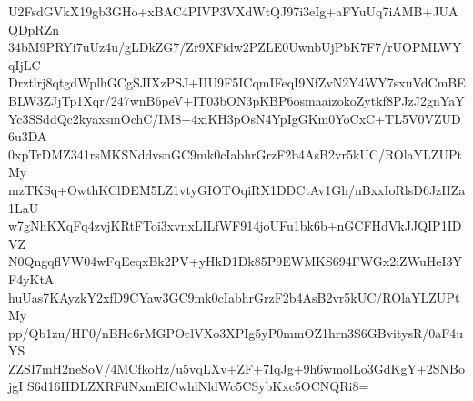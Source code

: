 U2FsdGVkX19gb3GHo+xBAC4PIVP3VXdWtQJ97i3eIg+aFYuUq7iAMB+JUAQDpRZn
34bM9PRYi7uUz4u/gLDkZG7/Zr9XFidw2PZLE0UwnbUjPbK7F7/rUOPMLWYqIjLC
Drztlrj8qtgdWplhGCgSJIXzPSJ+IIU9F5ICqmIFeqI9NfZvN2Y4WY7sxuVdCmBE
BLW3ZJjTp1Xqr/247wnB6peV+IT03bON3pKBP6osmaaizokoZytkf8PJzJ2gnYaY
Yc3SSddQc2kyaxsmOchC/IM8+4xiKH3pOsN4YpIgGKm0YoCxC+TL5V0VZUD6u3DA
0xpTrDMZ341rsMKSNddvsnGC9mk0cIabhrGrzF2b4AsB2vr5kUC/ROlaYLZUPtMy
mzTKSq+OwthKClDEM5LZ1vtyGIOTOqiRX1DDCtAv1Gh/nBxxIoRlsD6JzHZa1LaU
w7gNhKXqFq4zvjKRtFToi3xvnxLILfWF914joUFu1bk6b+nGCFHdVkJJQIP1IDVZ
N0QngqflVW04wFqEeqxBk2PV+yHkD1Dk85P9EWMKS694FWGx2iZWuHeI3YF4yKtA
huUas7KAyzkY2xfD9CYaw3GC9mk0cIabhrGrzF2b4AsB2vr5kUC/ROlaYLZUPtMy
pp/Qb1zu/HF0/nBHc6rMGPOclVXo3XPIg5yP0mmOZ1hrn3S6GBvitysR/0aF4uYS
ZZSI7mH2neSoV/4MCfkoHz/u5vqLXv+ZF+7IqJg+9h6wmolLo3GdKgY+2SNBojgI
S6d16HDLZXRFdNxmEICwhlNldWc5CSybKxc5OCNQRi8=
